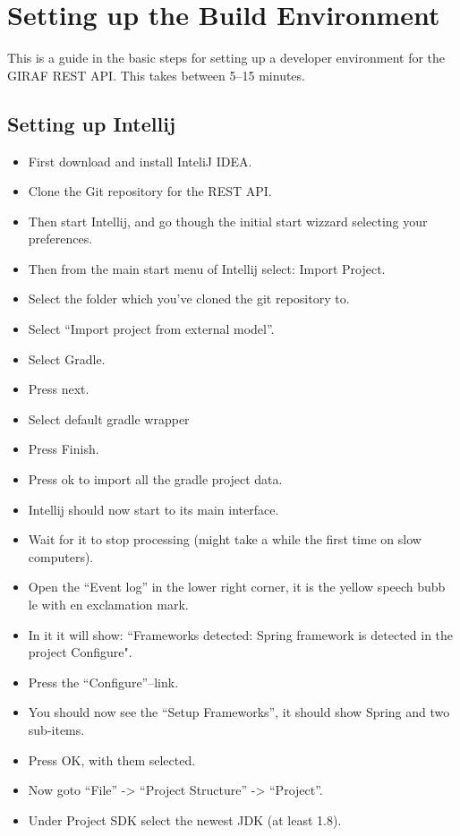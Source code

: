 \section{Setting up the Build Environment}
This is a guide in the basic steps for setting up a developer environment for the GIRAF REST API.
This takes between 5--15 minutes.
\subsection*{Setting up Intellij}
\begin{itemize}
    \item First download and install InteliJ IDEA.
    \item Clone the Git repository for the REST API.
    \item Then start Intellij, and go though the initial start wizzard selecting your preferences.
    \item Then from the main start menu of Intellij select: Import Project.
    \item Select the folder which you've cloned the git repository to.
    \item Select ``Import project from external model''.
    \item Select Gradle.
    \item Press next.
    \item Select default gradle wrapper
    \item Press Finish.
    \item Press ok to import all the gradle project data.
    \item Intellij should now start to its main interface.
    \item Wait for it to stop processing (might take a while the first time on slow computers).
    \item Open the ``Event log'' in the lower right corner, it is the yellow speech bubb
le with en exclamation mark.
    \item In it it will show: ``Frameworks detected: Spring framework is detected in the project Configure".
    \item Press the ``Configure''--link.
    \item You should now see the ``Setup Frameworks'', it should show Spring and two sub-items.
    \item Press OK, with them selected.
    \item Now goto ``File'' -> ``Project Structure'' -> ``Project''.
    \item Under Project SDK select the newest JDK (at least 1.8).

\end{itemize}
